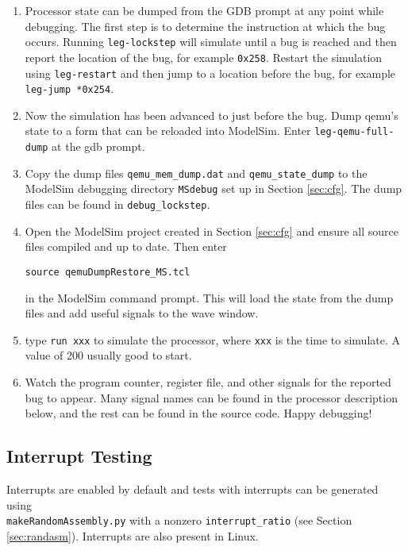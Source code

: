 \begin{enumerate}
\item Processor state can be dumped from the GDB prompt at any point while debugging.
 The first step is to determine the instruction at which the bug occurs.
 Running \texttt{leg-lockstep} will simulate until a bug is reached and then report the location of the bug, for example \texttt{0x258}.
 Restart the simulation using \texttt{leg-restart} and then jump to a location before the bug, for example \texttt{leg-jump *0x254}.
 
\item Now the simulation has been advanced to just before the bug. Dump qemu's state to a form that can be reloaded into ModelSim. Enter \texttt{leg-qemu-full-dump} at the gdb prompt.

\item Copy the dump files \texttt{qemu\_mem\_dump.dat} and \texttt{qemu\_state\_dump} to the ModelSim debugging directory \texttt{MSdebug} set up in Section \ref{sec:cfg}.
The dump files can be found in \texttt{debug\_lockstep}.

\item Open the ModelSim project created in Section \ref{sec:cfg} and ensure all source files compiled and up to date.
Then enter 
\begin{verbatim}source qemuDumpRestore_MS.tcl\end{verbatim}
in the ModelSim command prompt.
This will load the state from the dump files and add useful signals to the wave window. 

\item type \texttt{run xxx} to simulate the processor, where \texttt{xxx} is the time to simulate. 
A value of 200 usually good to start.

\item Watch the program counter, register file, and other signals for the reported bug to appear. 
Many signal names can be found in the processor description below, and the rest can be found in the source code.
Happy debugging!
\end{enumerate}

\subsection{Interrupt Testing}
Interrupts are enabled by default and tests with interrupts can be generated using \\\texttt{makeRandomAssembly.py} with a nonzero \texttt{interrupt\_ratio} (see Section \ref{sec:randasm}).
Interrupts are also present in Linux.

